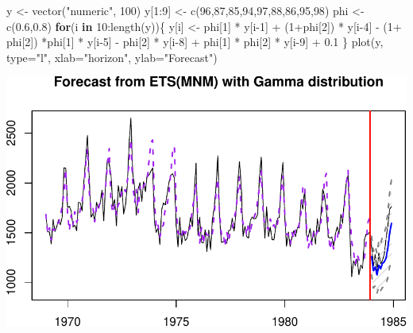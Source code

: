 \documentclass[
]{book}
\newenvironment{Shaded}{\begin{snugshade}}{\end{snugshade}}
\newcommand{\AttributeTok}[1]{\textcolor[rgb]{0.77,0.63,0.00}{#1}}
\newcommand{\ControlFlowTok}[1]{\textcolor[rgb]{0.13,0.29,0.53}{\textbf{#1}}}
\newcommand{\DecValTok}[1]{\textcolor[rgb]{0.00,0.00,0.81}{#1}}
\newcommand{\FloatTok}[1]{\textcolor[rgb]{0.00,0.00,0.81}{#1}}
\newcommand{\FunctionTok}[1]{\textcolor[rgb]{0.00,0.00,0.00}{#1}}
\newcommand{\NormalTok}[1]{#1}
\newcommand{\OtherTok}[1]{\textcolor[rgb]{0.56,0.35,0.01}{#1}}
\newcommand{\SpecialCharTok}[1]{\textcolor[rgb]{0.00,0.00,0.00}{#1}}
\newcommand{\StringTok}[1]{\textcolor[rgb]{0.31,0.60,0.02}{#1}}
\theoremstyle{definition}
\theoremstyle{definition}
\theoremstyle{definition}
\theoremstyle{definition}
\theoremstyle{remark}
\begin{document}
\begin{Shaded}
\begin{Highlighting}[]
\NormalTok{y }\OtherTok{\textless{}{-}} \FunctionTok{vector}\NormalTok{(}\StringTok{"numeric"}\NormalTok{, }\DecValTok{100}\NormalTok{)}
\NormalTok{y[}\DecValTok{1}\SpecialCharTok{:}\DecValTok{9}\NormalTok{] }\OtherTok{\textless{}{-}} \FunctionTok{c}\NormalTok{(}\DecValTok{96}\NormalTok{,}\DecValTok{87}\NormalTok{,}\DecValTok{85}\NormalTok{,}\DecValTok{94}\NormalTok{,}\DecValTok{97}\NormalTok{,}\DecValTok{88}\NormalTok{,}\DecValTok{86}\NormalTok{,}\DecValTok{95}\NormalTok{,}\DecValTok{98}\NormalTok{)}
\NormalTok{phi }\OtherTok{\textless{}{-}} \FunctionTok{c}\NormalTok{(}\FloatTok{0.6}\NormalTok{,}\FloatTok{0.8}\NormalTok{)}
\ControlFlowTok{for}\NormalTok{(i }\ControlFlowTok{in} \DecValTok{10}\SpecialCharTok{:}\FunctionTok{length}\NormalTok{(y))\{}
\NormalTok{    y[i] }\OtherTok{\textless{}{-}}\NormalTok{ phi[}\DecValTok{1}\NormalTok{] }\SpecialCharTok{*}\NormalTok{ y[i}\DecValTok{{-}1}\NormalTok{] }\SpecialCharTok{+}\NormalTok{ (}\DecValTok{1}\SpecialCharTok{+}\NormalTok{phi[}\DecValTok{2}\NormalTok{]) }\SpecialCharTok{*}\NormalTok{ y[i}\DecValTok{{-}4}\NormalTok{] }\SpecialCharTok{{-}}
\NormalTok{      (}\DecValTok{1}\SpecialCharTok{+}\NormalTok{ phi[}\DecValTok{2}\NormalTok{]) }\SpecialCharTok{*}\NormalTok{phi[}\DecValTok{1}\NormalTok{] }\SpecialCharTok{*}\NormalTok{ y[i}\DecValTok{{-}5}\NormalTok{] }\SpecialCharTok{{-}}\NormalTok{ phi[}\DecValTok{2}\NormalTok{] }\SpecialCharTok{*}\NormalTok{ y[i}\DecValTok{{-}8}\NormalTok{] }\SpecialCharTok{+}
\NormalTok{      phi[}\DecValTok{1}\NormalTok{] }\SpecialCharTok{*}\NormalTok{ phi[}\DecValTok{2}\NormalTok{] }\SpecialCharTok{*}\NormalTok{ y[i}\DecValTok{{-}9}\NormalTok{] }\SpecialCharTok{+} \FloatTok{0.1}
\NormalTok{\}}
\FunctionTok{plot}\NormalTok{(y, }\AttributeTok{type=}\StringTok{"l"}\NormalTok{, }\AttributeTok{xlab=}\StringTok{"horizon"}\NormalTok{, }\AttributeTok{ylab=}\StringTok{"Forecast"}\NormalTok{)}
\end{Highlighting}
\end{Shaded}

\includegraphics{adam_files/figure-latex/unnamed-chunk-57-1.pdf}
\end{document}

